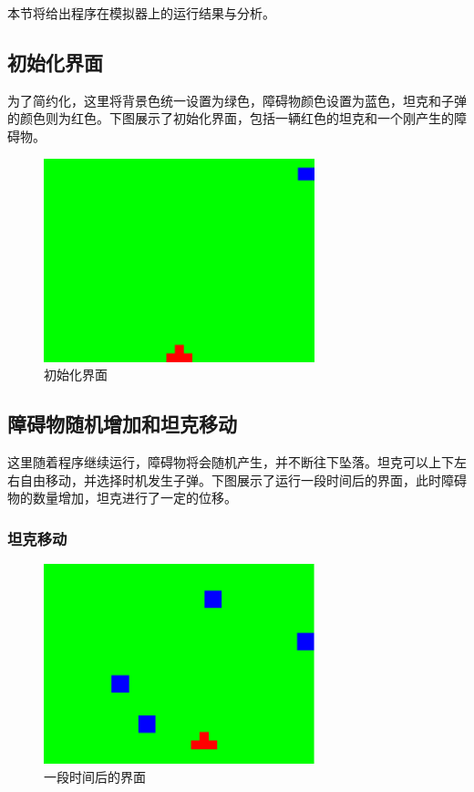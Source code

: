 本节将给出程序在模拟器上的运行结果与分析。
\subsection{初始化界面}
为了简约化，这里将背景色统一设置为绿色，障碍物颜色设置为蓝色，坦克和子弹的颜色则为红色。下图展示了初始化界面，包括一辆红色的坦克和一个刚产生的障碍物。\\

\begin{figure}[H]
  \centering
  \includegraphics[width=0.7\textwidth]{img/init.png}
  \caption{初始化界面
  }\label{fig:init}
\end{figure}

\subsection{障碍物随机增加和坦克移动}
这里随着程序继续运行，障碍物将会随机产生，并不断往下坠落。坦克可以上下左右自由移动，并选择时机发生子弹。下图展示了运行一段时间后的界面，此时障碍物的数量增加，坦克进行了一定的位移。\\

\subsubsection{坦克移动}
\begin{figure}[H]
  \centering
  \includegraphics[width=0.7\textwidth]{img/later.png}
  \caption{一段时间后的界面
  }\label{fig:later}
\end{figure}

